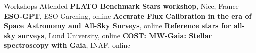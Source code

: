 \begin{rubric}{Workshops Attended}
\entry*[2025]
    \textbf{PLATO Benchmark Stars workshop}, Nice, France
\entry*[2024]
    \textbf{ESO-GPT}, ESO Garching, online
\entry*[2024]
    \textbf{Accurate Flux Calibration in the era of Space Astronomy and All-Sky Surveys}, online
\entry*[2021]
    \textbf{Reference stars for all-sky surveys}, Lund University, online
\entry*[2021]
    \textbf{COST: MW-Gaia: Stellar spectroscopy with Gaia}, INAF, online

\end{rubric}